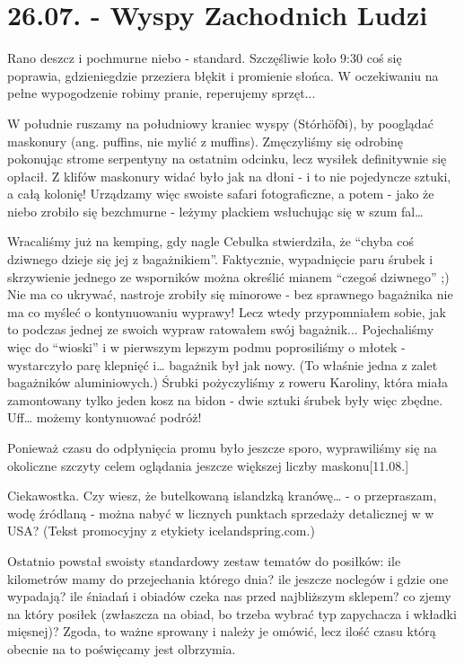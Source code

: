 \chapter{26.07. - Wyspy Zachodnich Ludzi}

Rano deszcz i pochmurne niebo - standard. Szczęśliwie koło 9:30 coś się poprawia, gdzieniegdzie przeziera błękit i promienie słońca. W oczekiwaniu na pełne wypogodzenie robimy pranie, reperujemy sprzęt...


W południe ruszamy na południowy kraniec wyspy (Stórhöfði), by pooglądać maskonury (ang. puffins, nie mylić z muffins). Zmęczyliśmy się odrobinę pokonując strome serpentyny na ostatnim odcinku, lecz wysiłek definitywnie się opłacił. Z klifów maskonury widać było jak na dłoni - i to nie pojedyncze sztuki, a całą kolonię! Urządzamy więc swoiste safari fotograficzne, a potem - jako że niebo zrobiło się bezchmurne - leżymy plackiem wsłuchując się w szum fal…

Wracaliśmy już na kemping, gdy nagle Cebulka stwierdziła, że “chyba coś dziwnego dzieje się jej z bagażnikiem”. Faktycznie, wypadnięcie paru śrubek i skrzywienie jednego ze wsporników można określić mianem “czegoś dziwnego” ;) Nie ma co ukrywać, nastroje zrobiły się minorowe - bez sprawnego bagażnika nie ma co myśleć o kontynuowaniu wyprawy! Lecz wtedy przypomniałem sobie, jak to podczas jednej ze swoich wypraw ratowałem swój bagażnik... Pojechaliśmy więc do “wioski” i  w pierwszym lepszym podmu poprosiliśmy o młotek - wystarczyło parę klepnięć i… bagażnik był jak nowy. (To właśnie jedna z zalet bagażników aluminiowych.) Śrubki pożyczyliśmy z roweru Karoliny, która miała zamontowany tylko jeden kosz na bidon - dwie sztuki śrubek były więc zbędne. Uff… możemy kontynuować podróż!

Ponieważ czasu do odpłynięcia promu było jeszcze sporo, wyprawiliśmy się na okoliczne szczyty celem oglądania jeszcze większej liczby maskonu[11.08.]

Ciekawostka. Czy wiesz, że butelkowaną islandzką kranówę… - o przepraszam, wodę źródlaną - można nabyć w licznych punktach sprzedaży detalicznej w w USA? (Tekst promocyjny z etykiety icelandspring.com.)

Ostatnio powstał swoisty standardowy zestaw tematów do posiłków: ile kilometrów mamy do przejechania którego dnia? ile jeszcze noclegów i gdzie one wypadają? ile śniadań i obiadów czeka nas przed najbliższym sklepem? co zjemy na który posiłek (zwłaszcza na obiad, bo trzeba wybrać typ zapychacza i wkładki mięsnej)? Zgoda, to ważne sprowany i należy je omówić, lecz ilość czasu którą obecnie na to poświęcamy jest olbrzymia.

